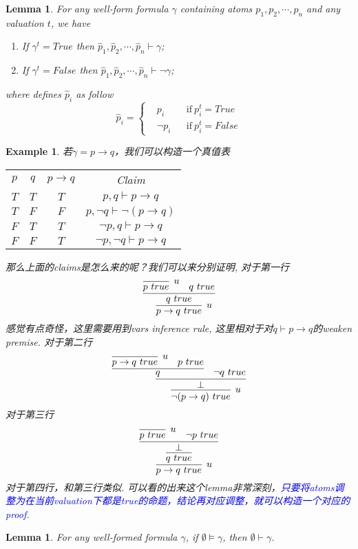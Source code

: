 \documentclass{article}
\theoremstyle{plain}
\newtheorem{lemma}[theorem]{Lemma}
\newtheorem{example}[theorem]{Example}
\theoremstyle{nonumberplain}
\newcommand{\bluet}[1]{\textcolor{blue}{#1}}
\begin{document}
\begin{lemma}\label{how-to-construct-provable-formula}
\rm For any well-form formula $\gamma$ containing atoms $p_1,p_2,\cdots,p_n$ and any valuation $t$, we have 
\begin{enumerate}
	\item If $\gamma^t = True$ then $\widehat{p}_1,\widehat{p}_2,\cdots,\widehat{p}_n \vdash \gamma$;
	\item If $\gamma^t = False$ then $\widehat{p}_1,\widehat{p}_2,\cdots,\widehat{p}_n \vdash \neg\gamma$;
\end{enumerate}
where defines $\widehat{p}_i$ as follow
$$
\widehat{p}_i = \left\{
\begin{aligned}
&p_i && \text{if}~p_i^t = True \\
&\neg p_i && \text{if}~p_i^t = False
\end{aligned}
\right.
$$
\end{lemma}

\begin{example}
\rm 若$\gamma = p \to q$，我们可以构造一个真值表
\begin{center}
\begin{tabular}{|c|c|c|c|}
\hline
$p$ & $q$ & $p \to q$ & Claim \\ 
$T$ & $T$ & $T$ & $p , q \vdash p \to q$ \\
$T$ & $F$ & $F$ & $p , \neg q \vdash \neg(p \to q)$ \\
$F$ & $T$ & $T$ & $\neg p , q \vdash p \to q$ \\
$F$ & $F$ & $T$ & $\neg p , \neg q \vdash p \to q$ \\ 
\hline
\end{tabular}
\end{center}
那么上面的claims是怎么来的呢？我们可以来分别证明, 对于第一行
$$
\infer[u]{p \to q~true}{\infer{q~true}{\infer[u]{p~true}{} & q~true}}
$$
感觉有点奇怪，这里需要用到vars inference rule, 这里相对于对$q \vdash p \to q$的weaken premise. 对于第二行
$$
\infer[u]{\neg (p \to q)~true}{\infer{\perp}{\infer{q}{\infer[u]{p \to q~true}{} & p~true} & \neg q ~true}}
$$
对于第三行
$$
\infer[u]{p \to q~true}{\infer{q~true}{\infer{\perp}{\infer[u]{p~true}{} & \neg p ~true}}}
$$
对于第四行，和第三行类似. 可以看的出来这个lemma非常深刻，\bluet{只要将atoms调整为在当前valuation下都是true的命题，结论再对应调整，就可以构造一个对应的proof}. 
\end{example}

\begin{lemma}\label{tautologies-are-provable}
\rm For any well-formed formula $\gamma$, if $\emptyset \vDash \gamma$, then $\emptyset \vdash \gamma$. 
\end{lemma}
\end{document}
